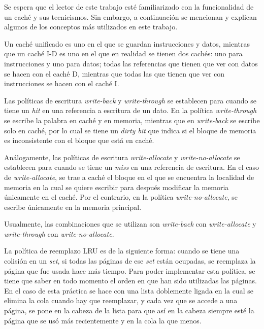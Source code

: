 \documentclass{article}
\begin{document}
Se espera que el lector de este trabajo est\'e familiarizado con la funcionalidad de un caché y sus tecnicismos. Sin embargo, a continuación se mencionan y explican algunos de los conceptos más utilizados en este trabajo.

Un caché unificado es uno en el que se guardan instrucciones y datos, mientras que un caché I-D es uno en el que en realidad se tienen dos cachés: uno para instrucciones y uno para datos; todas las referencias que tienen que ver con datos se hacen con el caché D, mientras que todas las que tienen que ver con instrucciones se hacen con el caché I.

Las políticas de escritura \textit{write-back} y \textit{write-through} se establecen para cuando se tiene un \textit{hit} en una referencia a escritura de un dato. En la política \textit{write-through} se escribe la palabra en caché y en memoria, mientras que en \textit{write-back} se escribe solo en caché, por lo cual se tiene un \textit{dirty bit} que indica si el bloque de memoria es inconsistente con el bloque que está en caché.

Análogamente, las políticas de escritura \textit{write-allocate} y \textit{write-no-allocate} se establecen para cuando se tiene un \textit{miss} en una referencia de escritura. En el caso de \textit{write-allocate}, se trae a caché el bloque en el que se encuentra la localidad de memoria en la cual se quiere escribir para después modificar la memoria únicamente en el caché. Por el contrario, en la política \textit{write-no-allocate}, se escribe únicamente en la memoria principal.

Usualmente, las combinaciones que se utilizan son \textit{write-back} con \textit{write-allocate} y \textit{write-through} con \textit{write-no-allocate}.

La política de reemplazo LRU es de la siguiente forma: cuando se tiene una colisión en un \textit{set}, si todas las páginas de ese \textit{set} están ocupadas, se reemplaza la página que fue usada hace más tiempo. Para poder implementar esta política, se tiene que saber en todo momento el orden en que han sido utilizadas las páginas. En el caso de esta práctica se hace con una lista doblemente ligada en la cual se elimina la cola cuando hay que reemplazar, y cada vez que se accede a una página, se pone en la cabeza de la lista para que así en la cabeza siempre esté la página que se usó más recientemente y en la cola la que menos.
\end{document}
